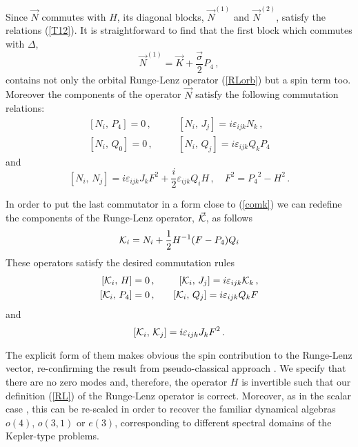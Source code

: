 \documentclass[a4paper,12pt]{article}
\begin{document}
Since $\vec{N}$ commutes with $H$, its diagonal  blocks,   
$\vec{N}^{(1)}$ and $\vec{N}^{(2)}$, satisfy the relations
(\ref{T12}). It is straightforward to find that the first block which 
commutes with $\Delta$,
\begin{equation}
\vec{N}^{(1)}=\vec{K}+\frac{\vec{\sigma}}{2}P_{4}\,,
\end{equation}
contains not only the orbital Runge-Lenz operator (\ref{RLorb}) but a 
spin term too. Moreover the components of the operator  $\vec{N}$
satisfy the following commutation relations:
\begin{eqnarray}
\left[{N}_{i},\,P_{4}\right]=0\,,&\quad&
\left[{N}_{i},\,J_{j}\right]=i\varepsilon_{ijk}{N}_{k}\,,\\
\left[{N}_{i},\,Q_{0}\right]=0\,,&\quad&
\left[{N}_{i},\,Q_{j}\right]=i\varepsilon_{ijk}Q_{k}P_4 \label{nq}
\end{eqnarray}
and
\begin{equation}
\left[{N}_{i},\,{N}_{j}\right]= i\varepsilon_{ijk}J_{k}F^2
+\frac{i}{2}\varepsilon_{ijk} Q_{i}H\,, \quad F^2={P_4}^2-H^2\,.
\end{equation}

In order to put the last commutator in a form close to (\ref{comk})
we can redefine the components of the Runge-Lenz operator, $\vec{\cal K}$, 
as follows
\begin{equation}\label{RL}
{\cal K}_{i}={N}_{i}+ \frac{1}{2}H^{-1}(F-P_4) Q_i
\end{equation}
These operators satisfy the desired commutation rules 
\begin{eqnarray}
\left[{\cal K}_{i},\,H\right]=0\,,&\quad&
\left[{\cal K}_{i},\,J_{j}\right]=i\varepsilon_{ijk}{\cal K}_{k}\,,\\
\left[{\cal K}_{i},\,P_4\right]=0\,,&\quad&
\left[{\cal K}_{i},\,Q_{j}\right]=i\varepsilon_{ijk}Q_{k}F
\end{eqnarray}
and
\begin{equation}
\left[{\cal K}_{i},\,{\cal K}_{j}\right]= i\varepsilon_{ijk}J_{k}F^2\,.
\end{equation}

The explicit form of them makes obvious the spin contribution to the 
Runge-Lenz vector, re-confirming the result from pseudo-classical approach 
\cite{VV,MV1}.
We specify that there are no zero modes \cite{CV2} and, therefore, the 
operator $H$ is invertible such that our definition (\ref{RL}) of the 
Runge-Lenz operator is correct. Moreover, as in the scalar case 
\cite{MAH,GRFH}, this can be re-scaled in order to recover the familiar 
dynamical algebras $o(4)$, $o(3,1)$ or $e(3)$, corresponding to different 
spectral domains of the Kepler-type problems.  
\end{document}
